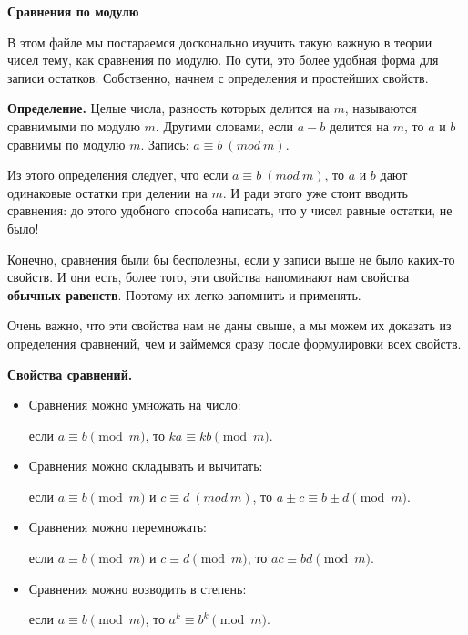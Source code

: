 \centerline{\bf \Huge Сравнения по модулю}

\begin{flushright}
        \scriptsize{}
\end{flushright}

В этом файле мы постараемся досконально изучить такую важную в теории чисел тему, как сравнения по модулю. По сути, это более удобная форма для записи остатков. Собственно, начнем с определения и простейших свойств.

\textbf{Определение.} Целые числа, разность которых делится на $m$, называются сравнимыми по модулю $m$. Другими словами, если $a-b$ делится на $m$, то $a$ и $b$ сравнимы по модулю $m$. Запись: $a \equiv b\ (mod\ m)$.

Из этого определения следует, что если $a \equiv b\ (mod\ m)$, то $a$ и $b$ дают одинаковые остатки при делении на $m$. И ради этого уже стоит вводить сравнения: до этого удобного способа написать, что у чисел равные остатки, не было!

Конечно, сравнения были бы бесполезны, если у записи выше не было каких-то свойств. И они есть, более того, эти свойства напоминают нам свойства \textbf{обычных равенств}. Поэтому их легко запомнить и применять.

Очень важно, что эти свойства нам не даны свыше, а мы можем их доказать из определения сравнений, чем и займемся сразу после формулировки всех свойств.

\textbf{Свойства сравнений.}

\begin{itemize}
    \item Сравнения можно умножать на число:
    
    если $a \equiv b\pmod{m}$, то $k a \equiv k b\pmod{m}$.
    \item Сравнения можно складывать и вычитать:
    
    если $a \equiv b\pmod{m}$ и $c \equiv d\ (mod\ m)$, то $a \pm c \equiv b \pm d\pmod{m}$.
    \item Сравнения можно перемножать:
    
    если $a \equiv b\pmod{m}$ и $c \equiv d\pmod{m}$, то $a c \equiv b d\pmod{m}$.
    \item Сравнения можно возводить в степень:
    
    если $a \equiv b\pmod{m}$, то $a^k \equiv b^k\pmod{m}$.
\end{itemize}


\newpage

\hspace{3mm}

